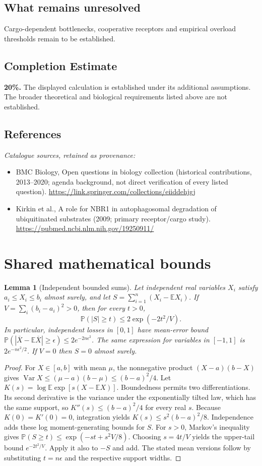 \documentclass[11pt]{article}
\newcommand{\E}{\mathbb E}
\newcommand{\Prob}{\mathbb P}
\DeclareMathOperator{\Var}{Var}
\providecommand{\E}{\mathbb E}
\providecommand{\Prob}{\mathbb P}
\providecommand{\Var}{\operatorname{Var}}
\newtheorem{sharedlemma}{Lemma}[section]
\begin{document}
\subsection{What remains unresolved}
Cargo-dependent bottlenecks, cooperative receptors and empirical overload thresholds remain to be established.
\subsection{Completion Estimate}
\textbf{20\%.} The displayed calculation is established under its additional assumptions. The broader theoretical and biological requirements listed above are not established.
\subsection{References}
\noindent\emph{Catalogue sources, retained as provenance:}
\begin{itemize}
\item BMC Biology, Open questions in biology collection (historical contributions, 2013--2020; agenda background, not direct verification of every listed question). \url{https://link.springer.com/collections/eiiddehjgj}
\item Kirkin et al., A role for NBR1 in autophagosomal degradation of ubiquitinated substrates (2009; primary receptor/cargo study). \url{https://pubmed.ncbi.nlm.nih.gov/19250911/}
\end{itemize}
\clearpage


\appendix
\section{Shared mathematical bounds}\label{app:bounds}
\begin{sharedlemma}[Independent bounded sums]\label{lem:bounded}
Let independent real variables $X_i$ satisfy $a_i\leq X_i\leq b_i$ almost surely,
and let $S=\sum_{i=1}^n(X_i-\E X_i)$. If
$V=\sum_i(b_i-a_i)^2>0$, then for every $t>0$,
\[
 \Prob(|S|\geq t)\leq 2\exp(-2t^2/V).
\]
In particular, independent losses in $[0,1]$ have mean-error bound
$\Prob(|\overline X-\E\overline X|\geq\epsilon)
\leq2e^{-2n\epsilon^2}$. The same expression for variables in $[-1,1]$
is $2e^{-n\epsilon^2/2}$. If $V=0$ then $S=0$ almost surely.
\end{sharedlemma}
\begin{proof}
For $X\in[a,b]$ with mean $\mu$, the nonnegative product
$(X-a)(b-X)$ gives
$\Var X\leq(\mu-a)(b-\mu)\leq(b-a)^2/4$.
Let $K(s)=\log\E\exp[s(X-\E X)]$.
Boundedness permits two differentiations. Its second derivative is the variance
under the exponentially tilted law, which has the same support, so
$K''(s)\leq(b-a)^2/4$ for every real $s$.
Because $K(0)=K'(0)=0$, integration yields
$K(s)\leq s^2(b-a)^2/8$.
Independence adds these log moment-generating bounds for $S$.
For $s>0$, Markov's inequality gives
$\Prob(S\geq t)\leq\exp(-st+s^2V/8)$.
Choosing $s=4t/V$ yields the upper-tail bound $e^{-2t^2/V}$.
Apply it also to $-S$ and add. The stated mean versions follow by substituting
$t=n\epsilon$ and the respective support widths.
\end{proof}
\end{document}
